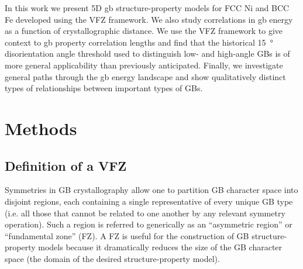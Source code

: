 \documentclass[final,twocolumn,12pt]{elsarticle}
\begin{document}
	In this work we present 5D \gls{gb} structure-property models for FCC Ni and BCC Fe developed using the VFZ framework. We also study correlations in \gls{gb} energy as a function of crystallographic distance. We use the VFZ framework to give context to \gls{gb} property correlation lengths and find that the historical 15\SI{}{\degree} disorientation angle threshold used to distinguish low- and high-angle GBs is of more general applicability than previously anticipated. Finally, we investigate general paths through the \gls{gb} energy landscape and show qualitatively distinct types of relationships between important types of GBs.
	
	
	
	

	
	\section{Methods} \label{sec:methods}
	\subsection{Definition of a VFZ}
	\label{sec:methods:vfz}
	Symmetries in GB crystallography allow one to partition GB character space into disjoint regions, each containing a single representative of every unique GB type (i.e. all those that cannot be related to one another by any relevant symmetry operation). Such a region is referred to generically as an ``asymmetric region'' or ``fundamental zone'' (FZ). A FZ is useful for the construction of GB structure-property models because it dramatically reduces the size of the GB character space (the domain of the desired structure-property model).
	
\end{document}
